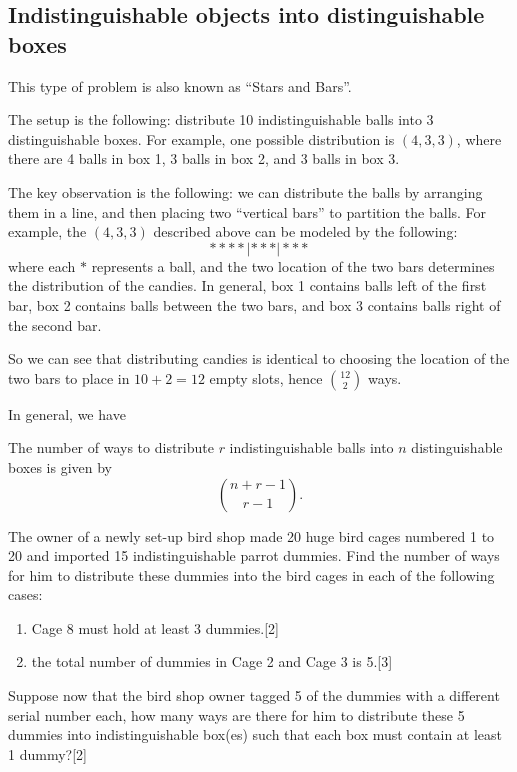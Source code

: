 \subsection{Indistinguishable objects into distinguishable boxes}
This type of problem is also known as ``Stars and Bars''. 

The setup is the following: distribute 10 indistinguishable balls into 3 distinguishable boxes. For example, one possible distribution is $(4,3,3)$, where there are 4 balls in box 1, 3 balls in box 2, and 3 balls in box 3.

The key observation is the following: we can distribute the balls by arranging them in a line, and then placing two ``vertical bars'' to partition the balls. For example, the $(4,3,3)$ described above can be modeled by the following:
\[ \ast\ast\ast\ast | \ast\ast\ast | \ast\ast\ast \]
where each $\ast$ represents a ball, and the two location of the two bars determines the distribution of the candies. In general, box 1 contains balls left of the first bar, box 2 contains balls between the two bars, and box 3 contains balls right of the second bar.

So we can see that distributing candies is identical to choosing the location of the two bars to place in $10+2=12$ empty slots, hence $\binom{12}{2}$ ways.

In general, we have
\begin{theorem}
The number of ways to distribute $r$ indistinguishable balls into $n$ distinguishable boxes is given by
\begin{equation}
\binom{n+r-1}{r-1}.
\end{equation}
\end{theorem}

\begin{exercise}
The owner of a newly set-up bird shop made 20 huge bird cages numbered 1 to 20 and imported 15 indistinguishable parrot dummies. Find the number of ways for him to distribute these dummies into the bird cages in each of the following cases:
\begin{enumerate}[label=(\alph*)]
\item Cage 8 must hold at least 3 dummies.\hfill [2]
\item the total number of dummies in Cage 2 and Cage 3 is 5.\hfill [3]
\end{enumerate}
Suppose now that the bird shop owner tagged 5 of the dummies with a different serial number each, how many ways are there for him to distribute these 5 dummies into indistinguishable box(es) such that each box must contain at least 1 dummy?\hfill [2]
\end{exercise}

